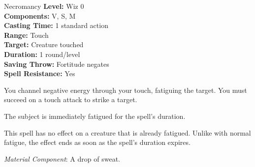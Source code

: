 {Necromancy}
{
	\textbf{Level:}
	Wiz 0\\
	\textbf{Components:}
	V, S, M\\
	\textbf{Casting Time:}
	1 standard action\\
	\textbf{Range:}
	Touch\\
	\textbf{Target:}
	Creature touched\\
	\textbf{Duration:}
	1 round/level\\
	\textbf{Saving Throw:}
	Fortitude negates\\
	\textbf{Spell Resistance:}
	Yes\\
}
{
	You channel negative energy through your touch, fatiguing the target. You must succeed on a touch attack to strike a target.

	The subject is immediately fatigued for the spell's duration.

	This spell has no effect on a creature that is already fatigued. Unlike with normal fatigue, the effect ends as soon as the spell's duration expires.

	\textit{Material Component}:
	A drop of sweat.

}
